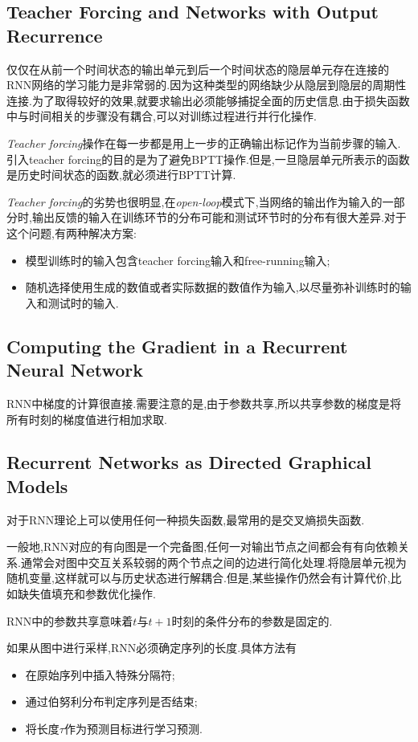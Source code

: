 \subsection{Teacher Forcing and Networks with Output Recurrence}

仅仅在从前一个时间状态的输出单元到后一个时间状态的隐层单元存在连接的RNN网络的学习能力是非常弱的.因为这种类型的网络缺少从隐层到隐层的周期性连接.为了取得较好的效果,就要求输出必须能够捕捉全面的历史信息.由于损失函数中与时间相关的步骤没有耦合,可以对训练过程进行并行化操作.

\textit{Teacher forcing}操作在每一步都是用上一步的正确输出标记作为当前步骤的输入.引入teacher forcing的目的是为了避免BPTT操作.但是,一旦隐层单元所表示的函数是历史时间状态的函数,就必须进行BPTT计算.

\textit{Teacher forcing}的劣势也很明显,在\textit{open-loop}模式下,当网络的输出作为输入的一部分时,输出反馈的输入在训练环节的分布可能和测试环节时的分布有很大差异.对于这个问题,有两种解决方案:
\begin{itemize}
    \item 模型训练时的输入包含teacher forcing输入和free-running输入;
    \item 随机选择使用生成的数值或者实际数据的数值作为输入,以尽量弥补训练时的输入和测试时的输入.
\end{itemize}

\subsection{Computing the Gradient in a Recurrent Neural Network}

RNN中梯度的计算很直接.需要注意的是,由于参数共享,所以共享参数的梯度是将所有时刻的梯度值进行相加求取.

\subsection{Recurrent Networks as Directed Graphical Models}

对于RNN理论上可以使用任何一种损失函数,最常用的是交叉熵损失函数.

一般地,RNN对应的有向图是一个完备图,任何一对输出节点之间都会有有向依赖关系.通常会对图中交互关系较弱的两个节点之间的边进行简化处理.将隐层单元视为随机变量,这样就可以与历史状态进行解耦合.但是,某些操作仍然会有计算代价,比如缺失值填充和参数优化操作.

RNN中的参数共享意味着$t$与$t+1$时刻的条件分布的参数是固定的.

如果从图中进行采样,RNN必须确定序列的长度.具体方法有
\begin{itemize}
    \item 在原始序列中插入特殊分隔符;
    \item 通过伯努利分布判定序列是否结束;
    \item 将长度$\tau$作为预测目标进行学习预测.
\end{itemize}

